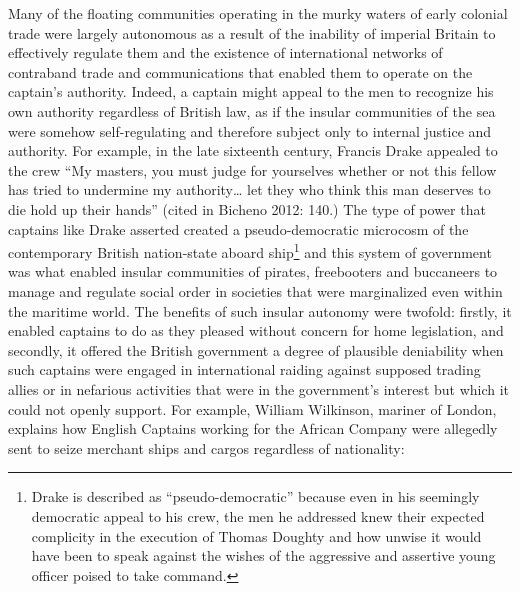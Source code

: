 \begin{styleStandard}
Many of the floating communities operating in the murky waters of early colonial trade were largely autonomous as a result of the inability of imperial Britain to effectively regulate them and the existence of international networks of contraband trade and communications that enabled them to operate on the captain’s authority. Indeed, a captain might appeal to the men to recognize his own authority regardless of British law, as if the insular communities of the sea were somehow self-regulating and therefore subject only to internal justice and authority. For example, in the late sixteenth century, Francis Drake appealed to the crew “My masters, you must judge for yourselves whether or not this fellow has tried to undermine my authority… let they who think this man deserves to die hold up their hands” (cited in Bicheno 2012: 140.) The type of power that captains like Drake asserted created a pseudo-democratic microcosm of the contemporary British nation-state aboard ship\footnote{ Drake is described as “pseudo-democratic” because even in his seemingly democratic appeal to his crew, the men he addressed knew their expected complicity in the execution of Thomas Doughty and how unwise it would have been to speak against the wishes of the aggressive and assertive young officer poised to take command. } and this system of government was what enabled insular communities of pirates, freebooters and buccaneers to manage and regulate social order in societies that were marginalized even within the maritime world. The benefits of such insular autonomy were twofold: firstly, it enabled captains to do as they pleased without concern for home legislation, and secondly, it offered the British government a degree of plausible deniability when such captains were engaged in international raiding against supposed trading allies or in nefarious activities that were in the government’s interest but which it could not openly support. For example, William Wilkinson, mariner of London, explains how English Captains working for the African Company were allegedly sent to seize merchant ships and cargos regardless of nationality: 
\end{styleStandard}


